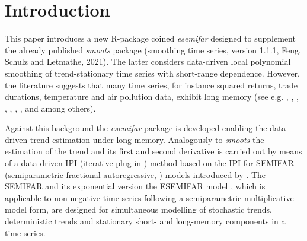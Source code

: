 \documentclass[12pt]{article}
\begin{document}
\section{Introduction}
This paper introduces a new R-package coined \textit{esemifar} designed to supplement the already published \textit{smoots} package (smoothing time series, version 1.1.1, Feng, Schulz and Letmathe, 2021). The latter considers data-driven local polynomial smoothing of trend-stationary time series with short-range dependence. However, the literature suggests that many time series, for instance squared returns, trade durations, temperature and air pollution data, exhibit long memory (see e.g. \cite{ding1993long}, \cite{ding1996modeling}, \cite{andersen1997intraday}, \cite{andersen1999forecasting}, \cite{baillie2002modeling}, \cite{cotter2005uncovering}, \cite{beran2015modelling}, \cite{beran2017statistics} and \cite{gil2020long} among others).  
  
Against this background the \textit{esemifar} package is developed enabling the data-driven trend estimation under long memory. Analogously to \textit{smoots} the estimation of the trend and its first and second derivative is carried out by means of a data-driven IPI (iterative plug-in \cite{gasser1991flexible}) method based on the IPI for SEMIFAR (semiparametric fractional autoregressive, \cite{beran2002semifar}) models introduced by \citet{beran2002iterative}. The SEMIFAR and its exponential version the ESEMIFAR model \citep{beran2015modelling}, which is applicable to non-negative time series following a semiparametric multiplicative model form, are designed for simultaneous modelling of stochastic trends, deterministic trends and stationary short- and long-memory components in a time series.
\end{document}
